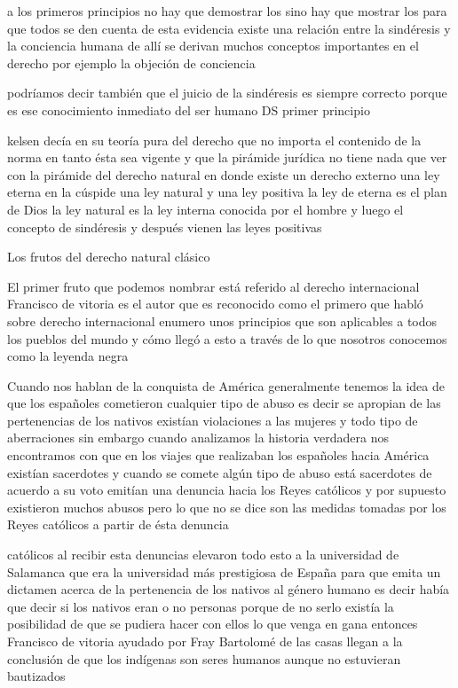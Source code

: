 \documentclass[12pt]{book}
\begin{document}
a los primeros principios no hay que demostrar los sino hay que mostrar los para que todos se den cuenta de esta evidencia existe una relación entre la sindéresis y la conciencia humana de allí se derivan muchos conceptos importantes en el derecho por ejemplo la objeción de conciencia

podríamos decir también que el juicio de la sindéresis es siempre correcto porque es ese conocimiento inmediato del ser humano DS primer principio

kelsen decía en su teoría pura del derecho que no importa el contenido de la norma en tanto ésta sea vigente y que la pirámide jurídica no tiene nada que ver con la pirámide del derecho natural en donde existe un derecho externo una ley eterna en la cúspide una ley natural y una ley positiva la ley de eterna es el plan de Dios la ley natural es la ley interna conocida por el hombre y luego el concepto de sindéresis y después vienen las leyes positivas


Los frutos del derecho natural clásico

El primer fruto que podemos nombrar está referido al derecho internacional Francisco de vitoria es el autor que es reconocido como el primero que habló sobre derecho internacional enumero unos principios que son aplicables a todos los pueblos del mundo y cómo llegó a esto a través de lo que nosotros conocemos como la leyenda negra

Cuando nos hablan de la conquista de América generalmente tenemos la idea de que los españoles cometieron cualquier tipo de abuso es decir se apropian de las pertenencias de los nativos existían violaciones a las mujeres y todo tipo de aberraciones sin embargo cuando analizamos la historia verdadera nos encontramos con que en los viajes que realizaban los españoles hacia América existían sacerdotes y cuando se comete algún tipo de abuso está sacerdotes de acuerdo a su voto emitían una denuncia hacia los Reyes católicos y por supuesto existieron muchos abusos pero lo que no se dice son las medidas tomadas por los Reyes católicos a partir de ésta denuncia

católicos al recibir esta denuncias elevaron todo esto a la universidad de Salamanca que era la universidad más prestigiosa de España para que emita un dictamen acerca de la pertenencia de los nativos al género humano es decir había que decir si los nativos eran o no personas porque de no serlo existía la posibilidad de que se pudiera hacer con ellos lo que venga en gana entonces Francisco de vitoria ayudado por Fray Bartolomé de las casas llegan a la conclusión de que los indígenas son seres humanos aunque no estuvieran bautizados
\end{document}

